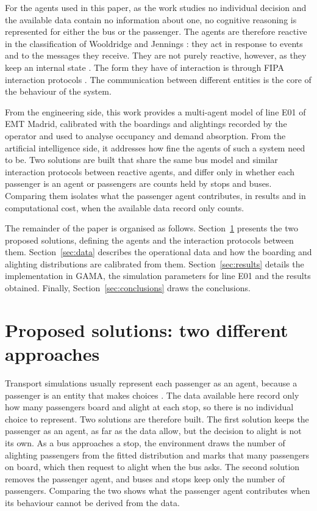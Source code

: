 \documentclass[a4paper,fleqn]{cas-sc}
\begin{document}
For the agents used in this paper, as the work studies no individual decision 
and the available data contain
no information about one, no cognitive reasoning is represented for either
the bus or the passenger. The agents are therefore reactive in the classification
of Wooldridge and Jennings \cite{wooldridge1995intelligent}: they act in
response to events and to the messages they receive. They are not purely
reactive, however, as they keep an internal state
\cite{wooldridge1999intelligent}.
The form they have of interaction is through FIPA interaction protocols \cite{poslad2007specifying}.
The communication between different entities is the core of the behaviour of the
system.

From the engineering side, this work provides a multi-agent model of line E01
of EMT Madrid, calibrated with the boardings and alightings recorded by the
operator and used to analyse occupancy and demand absorption.
From the artificial intelligence side, it addresses how fine the agents of
such a system need to be. Two solutions are built that share the same bus
model and similar interaction protocols between reactive agents, and differ
only in whether each passenger is an agent or passengers are counts held by
stops and buses.
Comparing them isolates what the passenger agent contributes, in results and
in computational cost, when the available data record only counts.

The remainder of the paper is organised as follows.
Section~\ref{sec:solutions} presents the two proposed solutions, defining the
agents and the interaction protocols between them.
Section~\ref{sec:data} describes the operational data and how the boarding and
alighting distributions are calibrated from them.
Section~\ref{sec:results} details the implementation in GAMA, the simulation
parameters for line E01 and the results obtained.
Finally, Section~\ref{sec:conclusions} draws the conclusions.

\section{Proposed solutions: two different approaches}\label{sec:solutions}

Transport simulations usually represent each passenger as an agent, because a
passenger is an entity that makes choices \cite{cats2016dynamic}. The data
available here record only how many passengers board and alight at each stop,
so there is no individual choice to represent. Two solutions are therefore
built. The first solution keeps the passenger as an agent, as far as the data allow,
but the decision to alight is not its own. As a bus approaches a stop, the environment
draws the number of alighting passengers from the
fitted distribution and marks that many passengers on board, which then
request to alight when the bus asks. The second solution removes the passenger
agent, and buses and stops keep only the number of passengers. Comparing the
two shows what the passenger agent contributes when its behaviour cannot be
derived from the data.
\end{document}
